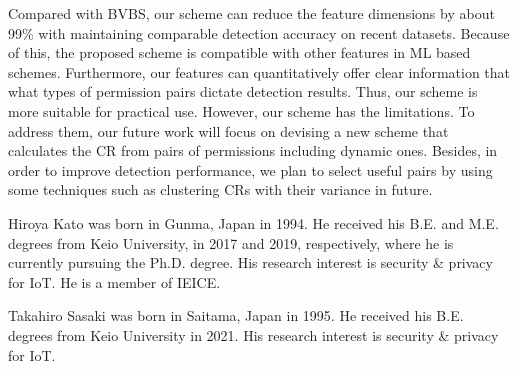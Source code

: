 \documentclass{ieeeaccess}
\begin{document}
Compared with BVBS, our scheme can reduce the feature dimensions by about 99\% with maintaining comparable detection accuracy on recent datasets.
Because of this, the proposed scheme is compatible with other features in ML based schemes.
Furthermore, our features can quantitatively offer clear information that what types of permission pairs dictate detection results.
Thus, our scheme is more suitable for practical use.
However, our scheme has the limitations.
To address them, our future work will focus on devising a new scheme that calculates the CR from pairs of permissions including dynamic ones.
Besides, in order to improve detection performance, we plan to select useful pairs by using some techniques such as clustering CRs with their variance in future.



\begin{IEEEbiography}{Hiroya Kato} was born in Gunma, Japan in 1994. He received his B.E. and M.E. degrees from Keio University, in 2017 and 2019, respectively, where he is currently pursuing the Ph.D. degree. His research interest is security \& privacy for IoT. He is a member of IEICE.
\end{IEEEbiography} 

\begin{IEEEbiography}{Takahiro Sasaki} was born in Saitama, Japan in 1995. He received his B.E. degrees from Keio University in 2021. His research interest is security \& privacy for IoT.
\end{IEEEbiography}
\end{document}
